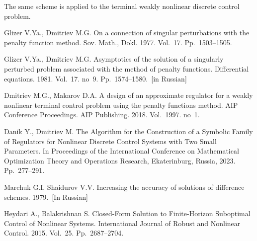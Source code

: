\documentclass[12pt]{llncs}
\begin{document}
The same scheme is applied to the terminal weakly nonlinear discrete control problem.



\begin{thebibliography}{9} %

 Glizer V.Ya., Dmitriev M.G. On a connection of singular perturbations with the penalty function method. Sov. Math., Dokl. 1977. Vol.~17. Pp.~1503--1505.

 Glizer V.Ya., Dmitriev M.G. Asymptotics of the solution of a singularly perturbed problem associated with the method of penalty functions. Differential equations. 1981. Vol.~17. no~9. Pp.~1574--1580.~[in Russian]

 Dmitriev M.G., Makarov D.A. A design of an approximate regulator for a weakly nonlinear terminal control problem using the penalty functions method. AIP Conference Proceedings. AIP Publishing. 2018. Vol.~1997. no~1.

 Danik Y., Dmitriev M. The Algorithm for the Construction of a Symbolic Family of Regulators for Nonlinear Discrete Control Systems with Two Small Parameters. In Proceedings of the International Conference on Mathematical Optimization Theory and Operations Research, Ekaterinburg, Russia, 2023. Pp.~277--291.

  Marchuk G.I, Shaidurov V.V. Increasing the accuracy of solutions of difference schemes. 1979.~[In Russian]

 Heydari A., Balakrishnan S. Closed-Form Solution to Finite-Horizon Suboptimal Control of Nonlinear Systems. International Journal of Robust and Nonlinear Control. 2015. Vol.~25. Pp.~2687--2704.




\end{thebibliography}
\end{document}
